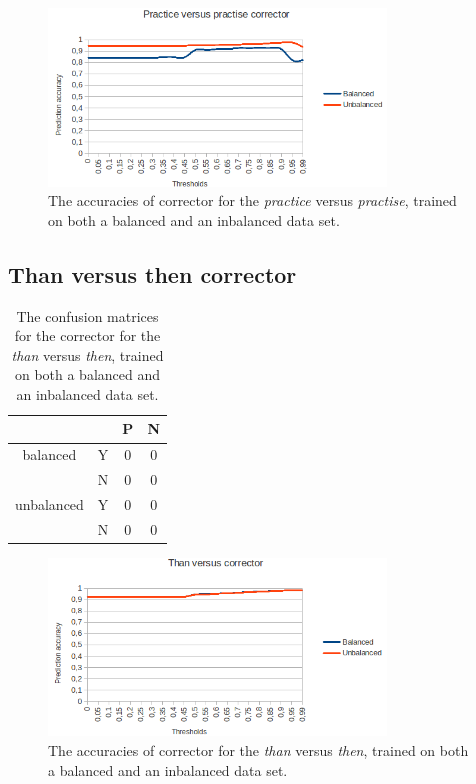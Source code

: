 \documentclass[12pt]{article}
\begin{document}
\begin{figure}[H]
\centering
\includegraphics[width=0.8\textwidth]{accuracy_practicepractise.png}
\caption{The accuracies of corrector for the \emph{practice} versus \emph{practise}, trained on both a balanced and an inbalanced data set.}
\end{figure}

\subsection{Than versus then corrector}

\begin{table}[H] \footnotesize
\centering
\begin{tabular}{|c|c|c|c|}
\hline
&&P&N\\
\hline
balanced&Y&0&0\\
&N&0&0\\
\hline
\hline
unbalanced&Y&0&0\\
&N&0&0\\
\hline
\end{tabular}
\caption{The confusion matrices for the corrector for the \emph{than} versus \emph{then}, trained on both a balanced and an inbalanced data set.}
\end{table}

\begin{figure}[H]
\centering
\includegraphics[width=0.8\textwidth]{accuracy_thanthen.png}
\caption{The accuracies of corrector for the \emph{than} versus \emph{then}, trained on both a balanced and an inbalanced data set.}
\end{figure}
\end{document}
